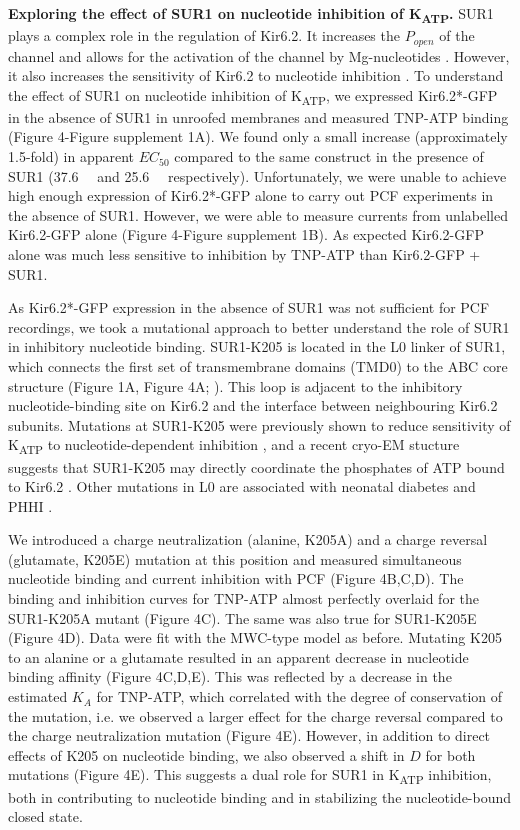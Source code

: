 \documentclass[10pt,lineno, doublespacing]{elife}
\begin{document}
\textbf{Exploring the effect of SUR1 on nucleotide inhibition of K\textsubscript{ATP}.}
SUR1 plays a complex role in the regulation of Kir6.2.
It increases the $P_{open}$ of the channel and allows for the activation of the channel by Mg-nucleotides \citep{RN59, RN10, RN83, RN77, RN85}.
However, it also increases the sensitivity of Kir6.2 to nucleotide inhibition \citep{RN83, RN77, RN85}.
To understand the effect of SUR1 on nucleotide inhibition of K\textsubscript{ATP}, we expressed Kir6.2*-GFP in the absence of SUR1 in unroofed membranes and measured TNP-ATP binding (Figure 4-Figure supplement 1A).
We found only a small increase (approximately 1.5-fold) in apparent $EC_{50}$ compared to the same construct in the presence of SUR1 (\SI{37.6}{\micro\Molar} and \SI{25.6}{\micro\Molar} respectively).
Unfortunately, we were unable to achieve high enough expression of Kir6.2*-GFP alone to carry out PCF experiments in the absence of SUR1.
However, we were able to measure currents from unlabelled Kir6.2-GFP alone (Figure 4-Figure supplement 1B).
As expected Kir6.2-GFP alone was much less sensitive to inhibition by TNP-ATP than Kir6.2-GFP + SUR1.

As Kir6.2*-GFP expression in the absence of SUR1 was not sufficient for PCF recordings, we took a mutational approach to better understand the role of SUR1 in inhibitory nucleotide binding.
SUR1-K205 is located in the L0 linker of SUR1, which connects the first set of transmembrane domains (TMD0) to the ABC core structure (Figure 1A, Figure 4A; \cite{RN6, RN7}).
This loop is adjacent to the inhibitory nucleotide-binding site on Kir6.2 and the interface between neighbouring Kir6.2 subunits.
Mutations at SUR1-K205 were previously shown to reduce sensitivity of K\textsubscript{ATP} to nucleotide-dependent inhibition \citep{RN95, RN96}, and a recent cryo-EM stucture suggests that SUR1-K205 may directly coordinate the phosphates of ATP bound to Kir6.2 \citep{RN96}.
Other mutations in L0 are associated with neonatal diabetes \citep{RN15} and PHHI \citep{RN100}.

We introduced a charge neutralization (alanine, K205A) and a charge reversal (glutamate, K205E) mutation at this position and measured simultaneous nucleotide binding and current inhibition with PCF (Figure 4B,C,D).
The binding and inhibition curves for TNP-ATP almost perfectly overlaid for the SUR1-K205A mutant (Figure 4C).
The same was also true for SUR1-K205E (Figure 4D).
Data were fit with the MWC-type model as before.
Mutating K205 to an alanine or a glutamate resulted in an apparent decrease in nucleotide binding affinity (Figure 4C,D,E).
This was reflected by a decrease in the estimated $K_A$ for TNP-ATP, which correlated with the degree of conservation of the mutation, i.e. we observed a larger effect for the charge reversal compared to the charge neutralization mutation (Figure 4E).
However, in addition to direct effects of K205 on nucleotide binding, we also observed a shift in $D$ for both mutations (Figure 4E).
This suggests a dual role for SUR1 in K\textsubscript{ATP} inhibition, both in contributing to nucleotide binding and in stabilizing the nucleotide-bound closed state.
\end{document}
